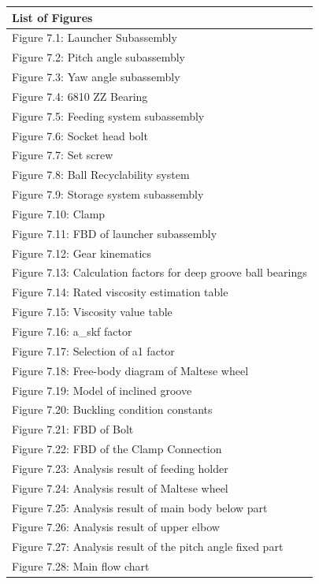 \documentclass[12pt]{report}
\begin{document}
\begin{table}[h!]
\centering
\begin{tabular}{|p{15cm}|}
\hline
\textbf{List of Figures} \\ \hline
Figure 7.1: Launcher Subassembly \\ \hline
Figure 7.2: Pitch angle subassembly \\ \hline
Figure 7.3: Yaw angle subassembly \\ \hline
Figure 7.4: 6810 ZZ Bearing \\ \hline
Figure 7.5: Feeding system subassembly \\ \hline
Figure 7.6: Socket head bolt \\ \hline
Figure 7.7: Set screw \\ \hline
Figure 7.8: Ball Recyclability system \\ \hline
Figure 7.9: Storage system subassembly \\ \hline
Figure 7.10: Clamp \\ \hline
Figure 7.11: FBD of launcher subassembly \\ \hline
Figure 7.12: Gear kinematics \\ \hline
Figure 7.13: Calculation factors for deep groove ball bearings \\ \hline
Figure 7.14: Rated viscosity estimation table \\ \hline
Figure 7.15: Viscosity value table\\ \hline
Figure 7.16: a\_skf factor\\ \hline
Figure 7.17: Selection of a1 factor\\ \hline
Figure 7.18: Free-body diagram of Maltese wheel\\ \hline
Figure 7.19: Model of inclined groove\\ \hline
Figure 7.20: Buckling condition constants\\ \hline
Figure 7.21: FBD of Bolt\\ \hline
Figure 7.22: FBD of the Clamp Connection\\ \hline
Figure 7.23: Analysis result of feeding holder\\ \hline
Figure 7.24: Analysis result of Maltese wheel\\ \hline
Figure 7.25: Analysis result of main body below part\\ \hline
Figure 7.26: Analysis result of upper elbow\\ \hline
Figure 7.27: Analysis result of the pitch angle fixed part\\ \hline
Figure 7.28: Main flow chart\\ \hline

\end{tabular}
\end{table}
\end{document}
